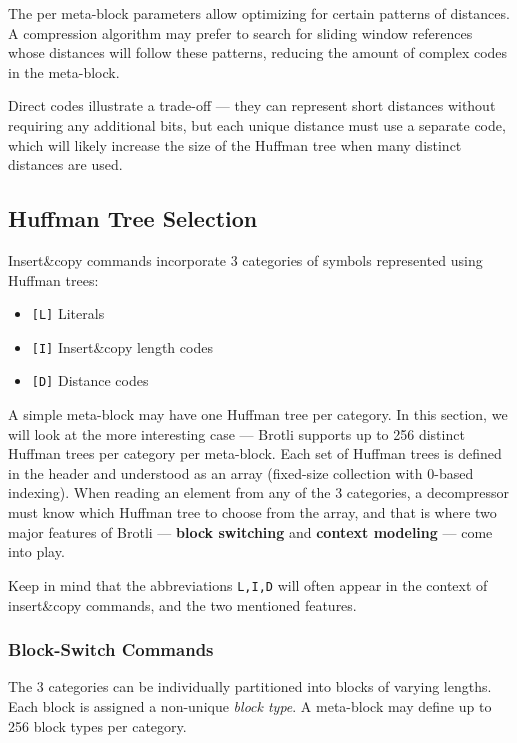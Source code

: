 \documentclass[english,master,dept460,male,cpp,cpdeclaration]{diploma}
\newcommand{\nosep}{\itemsep0em}
\begin{document}
	\noindent
	The per meta-block parameters allow optimizing for certain patterns of distances. A compression algorithm may prefer to search for sliding window references whose distances will follow these patterns, reducing the amount of complex codes in the meta-block.
	
	Direct codes illustrate a trade-off --- they can represent short distances without requiring any additional bits, but each unique distance must use a separate code, which will likely increase the size of the Huffman tree when many distinct distances are used.
	
	\subsection{Huffman Tree Selection}
	\label{sec:lid-categories}
	
	Insert\&copy commands incorporate 3 categories of symbols represented using Huffman trees:
	
	\begin{itemize} \nosep
		\item \texttt{[L]} Literals
		\item \texttt{[I]} Insert\&copy length codes
		\item \texttt{[D]} Distance codes
	\end{itemize}
	
	\noindent
	A simple meta-block may have one Huffman tree per category. In this section, we will look at the more interesting case --- Brotli supports up to 256 distinct Huffman trees per category per meta-block. Each set of Huffman trees is defined in the header and understood as an array (fixed-size collection with 0-based indexing). When reading an element from any of the 3 categories, a decompressor must know which Huffman tree to choose from the array, and that is where two major features of Brotli --- \textbf{block switching} and \textbf{context modeling} --- come into play.
	
	Keep in mind that the abbreviations \verb|L,I,D| will often appear in the context of insert\&copy commands, and the two mentioned features.
	
		\subsubsection{Block-Switch Commands}
		
		The 3 categories can be individually partitioned into blocks of varying lengths. Each block is assigned a non-unique \emph{block type}. A meta-block may define up to 256 block types per category.
		
\end{document}
